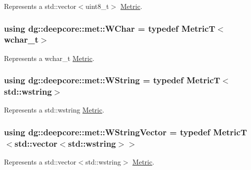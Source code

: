 Represents a {\ttfamily std\+::vector$<$uint8\+\_\+t$>$} \hyperlink{classdg_1_1deepcore_1_1_metric}{Metric}. 

\subsubsection[{\texorpdfstring{W\+Char}{WChar}}]{\setlength{\rightskip}{0pt plus 5cm}using {\bf dg\+::deepcore\+::met\+::\+W\+Char} = typedef MetricT$<$wchar\+\_\+t$>$}\hypertarget{group___process_metrics_ga1b9b88b573ba6176c03d75acb590e962}{}\label{group___process_metrics_ga1b9b88b573ba6176c03d75acb590e962}


Represents a {\ttfamily wchar\+\_\+t} \hyperlink{classdg_1_1deepcore_1_1_metric}{Metric}. 

\subsubsection[{\texorpdfstring{W\+String}{WString}}]{\setlength{\rightskip}{0pt plus 5cm}using {\bf dg\+::deepcore\+::met\+::\+W\+String} = typedef MetricT$<$std\+::wstring$>$}\hypertarget{group___process_metrics_gab5555b62cbb470dbeed23c40147b9e06}{}\label{group___process_metrics_gab5555b62cbb470dbeed23c40147b9e06}


Represents a {\ttfamily std\+::wstring} \hyperlink{classdg_1_1deepcore_1_1_metric}{Metric}. 

\subsubsection[{\texorpdfstring{W\+String\+Vector}{WStringVector}}]{\setlength{\rightskip}{0pt plus 5cm}using {\bf dg\+::deepcore\+::met\+::\+W\+String\+Vector} = typedef MetricT$<$std\+::vector$<$std\+::wstring$>$$>$}\hypertarget{group___process_metrics_ga3cc43c3b19277ff7be5246bcc8c1e954}{}\label{group___process_metrics_ga3cc43c3b19277ff7be5246bcc8c1e954}


Represents a {\ttfamily std\+::vector$<$std\+::wstring$>$} \hyperlink{classdg_1_1deepcore_1_1_metric}{Metric}. 

